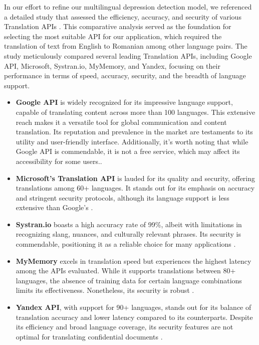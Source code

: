 \quad In our effort to refine our multilingual depression detection model, we referenced a detailed study that assessed the efficiency, accuracy, and security of various Translation APIs \cite{rashmi2020comparison}. This comparative analysis served as the foundation for selecting the most suitable API for our application, which required the translation of text from English to Romanian among other language pairs. The study meticulously compared several leading Translation APIs, including Google API, Microsoft, Systran.io, MyMemory, and Yandex, focusing on their performance in terms of speed, accuracy, security, and the breadth of language support.
\begin{itemize}
\item \textbf{Google API} is widely recognized for its impressive language support, capable of translating content across more than 100 languages. This extensive reach makes it a versatile tool for global communication and content translation. Its reputation and prevalence in the market are testaments to its utility and user-friendly interface. Additionally, it's worth noting that while Google API is commendable, it is not a free service, which may affect its accessibility for some users.\cite{rashmi2020comparison}.

\item \textbf{Microsoft's Translation API} is lauded for its quality and security, offering translations among 60+ languages. It stands out for its emphasis on accuracy and stringent security protocols, although its language support is less extensive than Google's \cite{rashmi2020comparison}.

\item \textbf{Systran.io} boasts a high accuracy rate of 99\%, albeit with limitations in recognizing slang, nuances, and culturally relevant phrases. Its security is commendable, positioning it as a reliable choice for many applications \cite{rashmi2020comparison}.

\item \textbf{MyMemory} excels in translation speed but experiences the highest latency among the APIs evaluated. While it supports translations between 80+ languages, the absence of training data for certain language combinations limits its effectiveness. Nonetheless, its security is robust \cite{rashmi2020comparison}.

\item \textbf{Yandex API}, with support for 90+ languages, stands out for its balance of translation accuracy and lower latency compared to its counterparts. Despite its efficiency and broad language coverage, its security features are not optimal for translating confidential documents \cite{rashmi2020comparison}.
\end{itemize}

